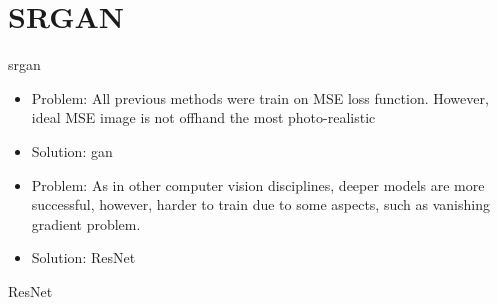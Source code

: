 \documentclass[hyperref={unicode}, xcolor=dvipsnames, t]{beamer}
\begin{document}
\section{SRGAN}
\begin{frame}{\texorpdfstring{\gls{srgan}}{Lg}}
    \begin{itemize}
        \item<1,3> Problem: All previous methods were train on MSE loss function. However, ideal MSE image is not offhand the most photo-realistic
        \item<1,3> Solution: \gls{gan}
        \newline
        \item<3> Problem: As in other computer vision disciplines, deeper models are more successful, however, harder to train due to some aspects, such as vanishing gradient problem.
        \item<3> Solution: ResNet
    \end{itemize}
    
    \begin{center}
    \end{center}
    
\end{frame}


\begin{frame}{ResNet}
    \begin{center}
    \end{center}
\end{frame}
\end{document}
